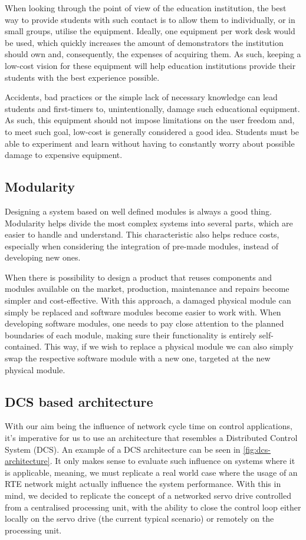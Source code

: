 When looking through the point of view of the education institution, the best way to provide students with such contact is to allow them to individually, or in small groups, utilise the equipment.
Ideally, one equipment per work desk would be used, which quickly increases the amount of demonstrators the institution should own and, consequently, the expenses of acquiring them.
As such, keeping a low-cost vision for these equipment will help education institutions provide their students with the best experience possible.

Accidents, bad practices or the simple lack of necessary knowledge can lead students and first-timers to, unintentionally, damage such educational equipment.
As such, this equipment should not impose limitations on the user freedom and, to meet such goal, low-cost is generally considered a good idea.
Students must be able to experiment and learn without having to constantly worry about possible damage to expensive equipment.

\subsection{Modularity}

Designing a system based on well defined modules is always a good thing.
Modularity helps divide the most complex systems into several parts, which are easier to handle and understand.
This characteristic also helps reduce costs, especially when considering the integration of pre-made modules, instead of developing new ones.

When there is possibility to design a product that reuses components and modules available on the market, production, maintenance and repairs become simpler and cost-effective.
With this approach, a damaged physical module can simply be replaced and software modules become easier to work with.
When developing software modules, one needs to pay close attention to the planned boundaries of each module, making sure their functionality is entirely self-contained.
This way, if we wish to replace a physical module we can also simply swap the respective software module with a new one, targeted at the new physical module.

\subsection{DCS based architecture}

With our aim being the influence of network cycle time on control applications, it's imperative for us to use an architecture that resembles a Distributed Control System (DCS).
An example of a DCS architecture can be seen in \autoref{fig:dcs-architecture}.
It only makes sense to evaluate such influence on systems where it is applicable, meaning, we must replicate a real world case where the usage of an RTE network might actually influence the system performance.
With this in mind, we decided to replicate the concept of a networked servo drive controlled from a centralised processing unit, with the ability to close the control loop either locally on the servo drive (the current typical scenario) or remotely on the processing unit.

